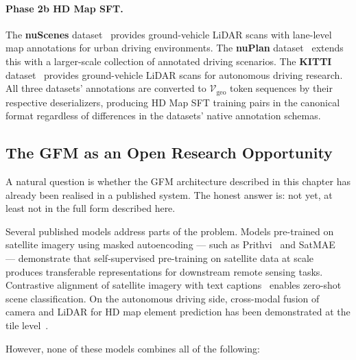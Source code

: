 \documentclass{book}
\begin{document}
\paragraph{Phase 2b HD Map SFT.}

The \textbf{nuScenes} dataset~\cite{caesar2020nuscenes}
provides ground-vehicle LiDAR scans with lane-level map
annotations for urban driving environments.  The
\textbf{nuPlan} dataset~\cite{nuplan2023} extends this
with a larger-scale collection of annotated driving
scenarios.  The \textbf{KITTI} dataset~\cite{geiger2012kitti}
provides ground-vehicle LiDAR scans for autonomous driving
research.  All three datasets' annotations are converted
to $\mathcal{V}_{\text{geo}}$ token sequences by their
respective deserializers, producing HD Map SFT training
pairs in the canonical format regardless of differences
in the datasets' native annotation schemas.

\subsection{The GFM as an Open Research Opportunity}
\label{sec:research_opportunity}

A natural question is whether the GFM architecture described
in this chapter has already been realised in a published
system.  The honest answer is: not yet, at least not in
the full form described here.

Several published models address parts of the problem.
Models pre-trained on satellite imagery using masked
autoencoding --- such as Prithvi~\cite{jakubik2023prithvi}
and SatMAE~\cite{cong2022satmae} --- demonstrate that
self-supervised pre-training on satellite data at scale
produces transferable representations for downstream remote
sensing tasks.  Contrastive alignment of satellite imagery
with text captions~\cite{liu2024remoteclip} enables
zero-shot scene classification.  On the autonomous driving
side, cross-modal fusion of camera and LiDAR for HD map
element prediction has been demonstrated at the tile
level~\cite{li2022bevformer,li2022hdmapnet,liao2022maptr}.

However, none of these models combines all of the following:
\end{document}
